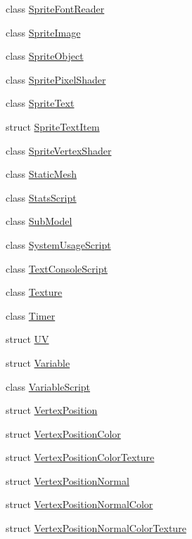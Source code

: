 \begin{DoxyCompactItemize}
\item 
class \hyperlink{classmage_1_1_sprite_font_reader}{Sprite\+Font\+Reader}
\item 
class \hyperlink{classmage_1_1_sprite_image}{Sprite\+Image}
\item 
class \hyperlink{classmage_1_1_sprite_object}{Sprite\+Object}
\item 
class \hyperlink{classmage_1_1_sprite_pixel_shader}{Sprite\+Pixel\+Shader}
\item 
class \hyperlink{classmage_1_1_sprite_text}{Sprite\+Text}
\item 
struct \hyperlink{structmage_1_1_sprite_text_item}{Sprite\+Text\+Item}
\item 
class \hyperlink{classmage_1_1_sprite_vertex_shader}{Sprite\+Vertex\+Shader}
\item 
class \hyperlink{classmage_1_1_static_mesh}{Static\+Mesh}
\item 
class \hyperlink{classmage_1_1_stats_script}{Stats\+Script}
\item 
class \hyperlink{classmage_1_1_sub_model}{Sub\+Model}
\item 
class \hyperlink{classmage_1_1_system_usage_script}{System\+Usage\+Script}
\item 
class \hyperlink{classmage_1_1_text_console_script}{Text\+Console\+Script}
\item 
class \hyperlink{classmage_1_1_texture}{Texture}
\item 
class \hyperlink{classmage_1_1_timer}{Timer}
\item 
struct \hyperlink{structmage_1_1_u_v}{UV}
\item 
struct \hyperlink{structmage_1_1_variable}{Variable}
\item 
class \hyperlink{classmage_1_1_variable_script}{Variable\+Script}
\item 
struct \hyperlink{structmage_1_1_vertex_position}{Vertex\+Position}
\item 
struct \hyperlink{structmage_1_1_vertex_position_color}{Vertex\+Position\+Color}
\item 
struct \hyperlink{structmage_1_1_vertex_position_color_texture}{Vertex\+Position\+Color\+Texture}
\item 
struct \hyperlink{structmage_1_1_vertex_position_normal}{Vertex\+Position\+Normal}
\item 
struct \hyperlink{structmage_1_1_vertex_position_normal_color}{Vertex\+Position\+Normal\+Color}
\item 
struct \hyperlink{structmage_1_1_vertex_position_normal_color_texture}{Vertex\+Position\+Normal\+Color\+Texture}

\end{DoxyCompactItemize}
